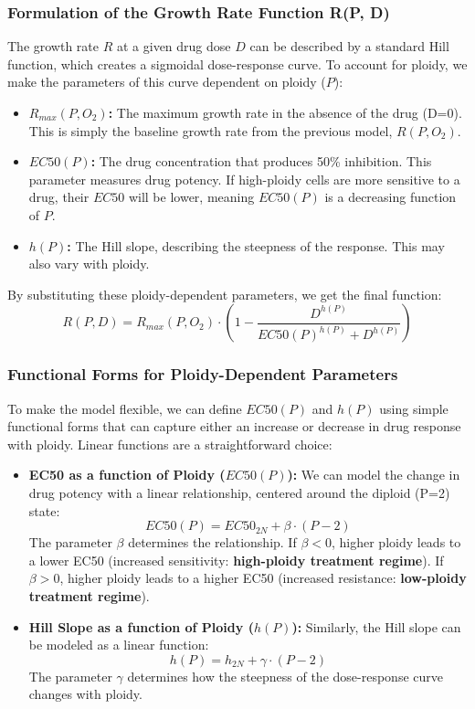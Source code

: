 \documentclass{article}
\begin{document}
\subsubsection*{Formulation of the Growth Rate Function R(P, D)}

The growth rate $R$ at a given drug dose $D$ can be described by a standard Hill function, which creates a sigmoidal dose-response curve. To account for ploidy, we make the parameters of this curve dependent on ploidy ($P$):
\begin{itemize}
    \item \textbf{$R_{max}(P, O_2)$:} The maximum growth rate in the absence of the drug (D=0). This is simply the baseline growth rate from the previous model, $R(P, O_2)$.
    \item \textbf{$EC50(P)$:} The drug concentration that produces 50\% inhibition. This parameter measures drug potency. If high-ploidy cells are more sensitive to a drug, their $EC50$ will be lower, meaning $EC50(P)$ is a decreasing function of $P$.
    \item \textbf{$h(P)$:} The Hill slope, describing the steepness of the response. This may also vary with ploidy.
\end{itemize}

By substituting these ploidy-dependent parameters, we get the final function:
\color{blue}
$$
R(P, D) = R_{max}(P, O_2) \cdot \left(1 - \frac{D^{h(P)}}{EC50(P)^{h(P)} + D^{h(P)}}\right)
$$
\color{black}

\subsubsection*{Functional Forms for Ploidy-Dependent Parameters}
To make the model flexible, we can define $EC50(P)$ and $h(P)$ using simple functional forms that can capture either an increase or decrease in drug response with ploidy. Linear functions are a straightforward choice:

\begin{itemize}
    \item \textbf{EC50 as a function of Ploidy ($EC50(P)$):} We can model the change in drug potency with a linear relationship, centered around the diploid (P=2) state:
    $$ EC50(P) = EC50_{2N} + \beta \cdot (P - 2) $$
    \color{blue}
    The parameter $\beta$ determines the relationship. If $\beta < 0$, higher ploidy leads to a lower EC50 (increased sensitivity: \textbf{ high-ploidy treatment regime}). If $\beta > 0$, higher ploidy leads to a higher EC50 (increased resistance:  \textbf{low-ploidy treatment regime}).
    \color{black}
    \item \textbf{Hill Slope as a function of Ploidy ($h(P)$):} Similarly, the Hill slope can be modeled as a linear function:
    $$ h(P) = h_{2N} + \gamma \cdot (P - 2) $$
    \color{blue}
    The parameter $\gamma$ determines how the steepness of the dose-response curve changes with ploidy.
    \color{black}
\end{itemize}
\end{document}
